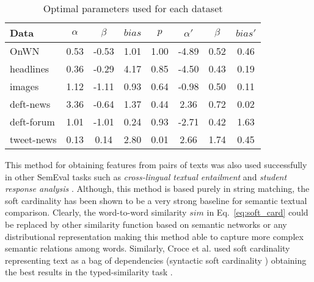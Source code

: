 \begin{table}[t!]
\begin{tabular}{|l|ccccccc|}
\hline 
{\footnotesize\bf Data} & {\footnotesize $\alpha$} & {\footnotesize $\beta$} & {\footnotesize $bias$} & {\footnotesize $p$} & {\footnotesize $\alpha'$} & {\footnotesize $\beta$} & {\footnotesize $bias'$}\tabularnewline
\hline 
{\scriptsize OnWN} & {\scriptsize 0.53} & {\scriptsize -0.53} & {\scriptsize 1.01} & {\scriptsize 1.00} & {\scriptsize -4.89} & {\scriptsize 0.52} & {\scriptsize 0.46}\tabularnewline
{\scriptsize headlines} & {\scriptsize 0.36} & {\scriptsize -0.29} & {\scriptsize 4.17} & {\scriptsize 0.85} & {\scriptsize -4.50} & {\scriptsize 0.43} & {\scriptsize 0.19}\tabularnewline
{\scriptsize images} & {\scriptsize 1.12} & {\scriptsize -1.11} & {\scriptsize 0.93} & {\scriptsize 0.64} & {\scriptsize -0.98} & {\scriptsize 0.50} & {\scriptsize 0.11}\tabularnewline
{\scriptsize deft-news} & {\scriptsize 3.36} & {\scriptsize -0.64} & {\scriptsize 1.37} & {\scriptsize 0.44} & {\scriptsize 2.36} & {\scriptsize 0.72} & {\scriptsize 0.02}\tabularnewline
{\scriptsize deft-forum} & {\scriptsize 1.01} & {\scriptsize -1.01} & {\scriptsize 0.24} & {\scriptsize 0.93} & {\scriptsize -2.71} & {\scriptsize 0.42} & {\scriptsize 1.63}\tabularnewline
{\scriptsize tweet-news} & {\scriptsize 0.13} & {\scriptsize 0.14} & {\scriptsize 2.80} & {\scriptsize 0.01} & {\scriptsize 2.66} & {\scriptsize 1.74} & {\scriptsize 0.45}\tabularnewline
\hline 
\end{tabular}\caption{Optimal parameters used for each dataset\label{tab:Optimal-parameters}}
\end{table}
This method for obtaining features from pairs of texts was also used
successfully in other SemEval tasks such as 
\emph{cross-lingual textual entailment }and \emph{student response analysis}
\cite{jimenez_soft_2012-1,jimenez_softcardinality:_2013}.
Although, this method is based purely in string matching, the soft
cardinality has been shown to be a very strong baseline for semantic textual
comparison. Clearly, the word-to-word similarity $sim$ in Eq.~\ref{eq:soft_card}
could be replaced by other similarity function based on semantic networks
or any distributional representation making this method able to capture
more complex semantic relations among words. Similarly, Croce et al.
used soft cardinality representing text as a bag of dependencies (syntactic
soft cardinality \cite{croce_distributional_2012}) obtaining the
best results in the typed-similarity task \cite{croce_unitor-core_2013}. 

